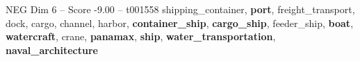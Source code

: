\begin{textsample}{NEG Dim 6 – Score -9.00 – t001558}  \label{ex:f6_neg_019}
shipping\_container, \textbf{port}, freight\_transport, dock, cargo, channel, harbor, \textbf{container\_ship}, \textbf{cargo\_ship}, feeder\_ship, \textbf{boat}, \textbf{watercraft}, crane, \textbf{panamax}, \textbf{ship}, \textbf{water\_transportation}, \textbf{naval\_architecture}

\end{textsample}
